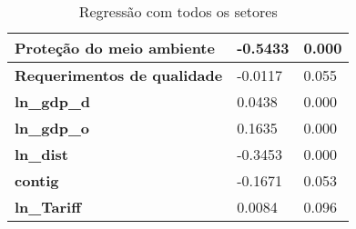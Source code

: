 \begin{table}[h]
\begin{tabular}{@{}lll@{}}
    \multicolumn{1}{l|}{\textbf{Proteção do meio ambiente}}                             & \multicolumn{1}{l|}{-0.5433} & 0.000         \\ \midrule
    \multicolumn{1}{l|}{\textbf{Requerimentos de qualidade}}                                      & \multicolumn{1}{l|}{-0.0117} & 0.055           \\ \midrule
    \multicolumn{1}{l|}{\textbf{ln\_gdp\_d}}                                                & \multicolumn{1}{l|}{0.0438}  & 0.000            \\ \midrule
    \multicolumn{1}{l|}{\textbf{ln\_gdp\_o}}                                                & \multicolumn{1}{l|}{0.1635}  & 0.000            \\ \midrule
    \multicolumn{1}{l|}{\textbf{ln\_dist}}                                                  & \multicolumn{1}{l|}{-0.3453} & 0.000           \\ \midrule
    \multicolumn{1}{l|}{\textbf{contig}}                                                    & \multicolumn{1}{l|}{-0.1671} & 0.053           \\ \midrule
    \textbf{ln\_Tariff}                                                                     & 0.0084                       & 0.096            \\ \bottomrule
    \end{tabular}
    \caption{Regressão com todos os setores}
    \label{Regressao}
\end{table}